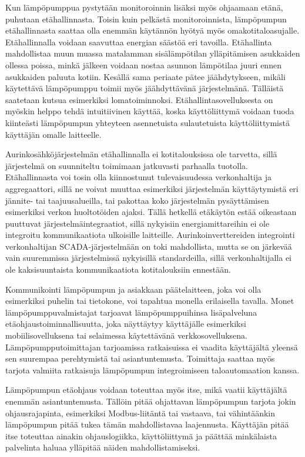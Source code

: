   Kun lämpöpumppua pystytään monitoroinnin lisäksi myös ohjaamaan etänä, puhutaan etähallinnasta. Toisin kuin pelkästä monitoroinnista, lämpöpumpun etähallinnasta saattaa olla enemmän käytännön hyötyä myös omakotitaloasujalle. Etähallinnalla voidaan saavuttaa energian säästöä eri tavoilla. Etähallinta mahdollistaa muun muassa matalamman sisälämpötilan ylläpitämisen asukkaiden ollessa poissa, minkä jälkeen voidaan nostaa asunnon lämpötilaa juuri ennen asukkaiden paluuta kotiin. Kesällä sama periaate pätee jäähdytykseen, mikäli käytettävä lämpöpumppu toimii myös jäähdyttävänä järjestelmänä. Tälläistä saatetaan kutsua esimerkiksi lomatoiminnoksi. Etähallintasovelluksesta on myöskin helppo tehdä intuitiivinen käyttää, koska käyttöliittymä voidaan tuoda kiinteästi lämpöpumpun yhteyteen asennetuista sulautetuista käyttöliittymistä käyttäjän omalle laitteelle.

  Aurinkosähköjärjestelmän etähallinnalla ei kotitalouksissa ole tarvetta, sillä järjestelmä on suunniteltu toimimaan jatkuvasti parhaalla tuotolla. Etähallinnasta voi tosin olla kiinnostunut tulevaisuudessa verkonhaltija ja aggregaattori, sillä ne voivat muuttaa esimerkiksi järjestelmän käyttäytymistä eri jännite- tai taajuusalueilla, tai pakottaa koko järjestelmän pysäyttämisen esimerkiksi verkon huoltotöiden ajaksi. Tällä hetkellä etäkäytön estää oikeastaan puuttuvat järjestelmäintegraatiot, sillä nykyisiin energiamittareihin ei ole integroitu kommunikaatiota ulkoisille laitteille. Aurinkoinverttereiden integrointi verkonhaltijan \gls{SCADA}-järjestelmään on toki mahdollista, mutta se on järkevää vain suuremmissa järjestelmissä nykyisillä standardeilla, sillä verkonhaltijalla ei ole kaksisuuntaista kommunikaatiota kotitalouksiin ennestään.

  Kommunikointi lämpöpumpun ja asiakkaan päätelaitteen, joka voi olla esimerkiksi puhelin tai tietokone, voi tapahtua monella erilaisella tavalla. Monet lämpöpumppuvalmistajat tarjoavat lämpöpumppuihinsa lisäpalveluna etäohjaustoiminnallisuutta, joka näyttäytyy käyttäjälle esimerkiksi mobiilisovelluksena tai selaimessa käytettävänä verkkosovelluksena. Lämpöpumpputoimittajan tarjoamissa ratkaisuissa ei vaadita käyttäjältä yleensä sen suurempaa perehtymistä tai asiantuntemusta. Toimittaja saattaa myös tarjota valmiita ratkaisuja lämpöpumpun integroimiseen taloautomaation kanssa.

  Lämpöpumpun etäohjaus voidaan toteuttaa myös itse, mikä vaatii käyttäjältä enemmän asiantuntemusta. Tällöin pitää ohjattavan lämpöpumpun tarjota jokin ohjausrajapinta, esimerkiksi Modbus-liitäntä tai vastaava, tai vähintäänkin lämpöpumpun pitää tukea tämän mahdollistavaa laajennusta. Käyttäjän pitää itse toteuttaa ainakin ohjauslogiikka, käyttöliittymä ja päättää minkälaista palvelinta haluaa ylläpitää näiden mahdollistamiseksi.

